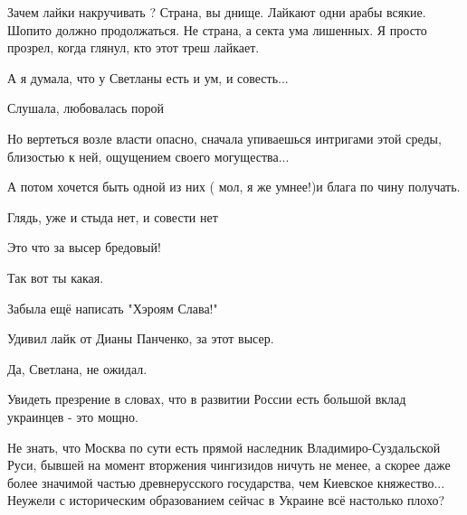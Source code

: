 \begin{itemize}
Зачем лайки накручивать ? Страна, вы днище. Лайкают одни арабы всякие. Шопито
должно продолжаться. Не страна, а секта ума лишенных. Я просто прозрел, когда
глянул, кто этот треш лайкает.

 

А я думала, что у Светланы есть и ум, и совесть...

Слушала, любовалась порой

Но вертеться возле власти опасно, сначала упиваешься интригами этой среды,
близостью к ней, ощущением своего могущества...

А потом хочется быть одной из них ( мол, я же умнее!)и блага по чину получать.

Глядь, уже и стыда нет, и совести нет

 
Это что за высер бредовый!

Так вот ты какая.

Забыла ещё написать "Хэроям Слава!"🤮

Удивил лайк от Дианы Панченко, за этот высер.


 

Да, Светлана, не ожидал.

Увидеть презрение в словах, что в развитии России есть большой вклад украинцев
- это мощно.

Не знать, что Москва по сути есть прямой наследник Владимиро-Суздальской Руси,
бывшей на момент вторжения чингизидов ничуть не менее, а скорее даже более
значимой частью древнерусского государства, чем Киевское княжество... Неужели с
историческим образованием сейчас в Украине всё настолько плохо?


 


\end{itemize}
